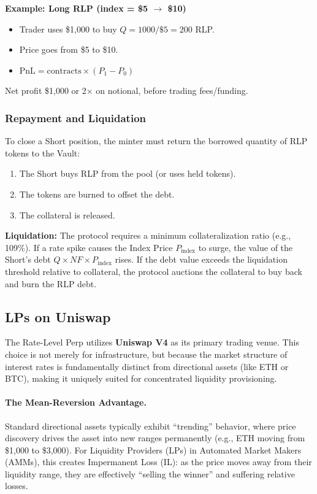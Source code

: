 \documentclass[12pt]{article}
\begin{document}
\noindent\textbf{Example: Long RLP (index = \$5 $\rightarrow$ \$10)}

\begin{itemize}
    \item Trader uses \$1,000 to buy $Q = 1000 / \$5 = 200$ RLP.
    \item Price goes from \$5 to \$10.
    \item $\text{PnL} = \text{contracts} \times (P_1 - P_0)$
\end{itemize}

Net profit \$1,000 or 2$\times$ on notional, before trading fees/funding.

\subsubsection{Repayment and Liquidation}

To close a Short position, the minter must return the borrowed quantity of RLP tokens to the Vault:

\begin{enumerate}
    \item The Short buys RLP from the pool (or uses held tokens).
    \item The tokens are burned to offset the debt.
    \item The collateral is released.
\end{enumerate}

\textbf{Liquidation:} The protocol requires a minimum collateralization ratio (e.g., 109\%). If a rate spike causes the Index Price $P_{\text{index}}$ to surge, the value of the Short's debt $Q \times NF \times P_{\text{index}}$ rises. If the debt value exceeds the liquidation threshold relative to collateral, the protocol auctions the collateral to buy back and burn the RLP debt.


\subsection{LPs on Uniswap}

The Rate-Level Perp utilizes \textbf{Uniswap V4} \cite{adams2024uniswap} as its primary trading venue. This choice is not merely for infrastructure, but because the market structure of interest rates is fundamentally distinct from directional assets (like ETH or BTC), making it uniquely suited for concentrated liquidity provisioning.

\paragraph{The Mean-Reversion Advantage.}
Standard directional assets typically exhibit ``trending'' behavior, where price discovery drives the asset into new ranges permanently (e.g., ETH moving from \$1,000 to \$3,000). For Liquidity Providers (LPs) in Automated Market Makers (AMMs), this creates Impermanent Loss (IL): as the price moves away from their liquidity range, they are effectively ``selling the winner'' and suffering relative losses.
\end{document}
